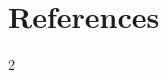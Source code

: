 \documentclass[9pt]{extarticle}
\begin{document}
\section{References}

\vspace{-4pt}
\scriptsize
\renewcommand{\bibsection}{}   %
\setlength{\bibsep}{1.3pt}
\setlength{\bibhang}{8pt}
\begin{multicols}{2}
\nocite{*}


\end{multicols}
\end{document}
